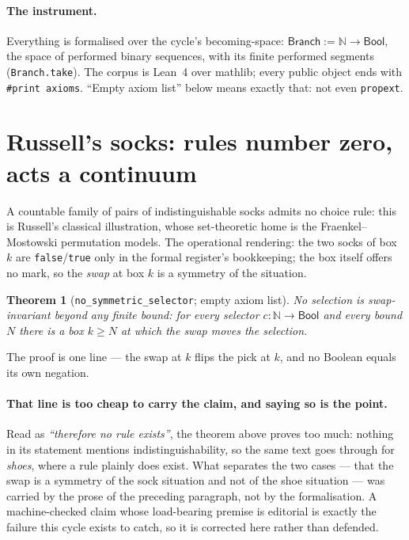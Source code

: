 \documentclass[11pt]{article}
\newtheorem{thm}{Theorem}[section]
\theoremstyle{remark}
\newcommand{\N}{\mathbb{N}}
\newcommand{\Branch}{\textsf{Branch}}
\begin{document}
\paragraph{The instrument.}  Everything is formalised over the cycle's
becoming-space: $\Branch := \N \to \mathsf{Bool}$, the space of
performed binary sequences, with its finite performed segments
(\texttt{Branch.take}).  The corpus is Lean~4 over mathlib; every public
object ends with \texttt{\#print axioms}.  ``Empty axiom list'' below
means exactly that: not even \texttt{propext}.

\section{Russell's socks: rules number zero, acts a continuum}
\label{sec:socks}

A countable family of pairs of indistinguishable socks admits no choice
rule: this is Russell's classical illustration, whose set-theoretic home
is the Fraenkel--Mostowski permutation models.  The operational
rendering: the two socks of box $k$ are \texttt{false}/\texttt{true} only
in the formal register's bookkeeping; the box itself offers no mark, so
the \emph{swap} at box $k$ is a symmetry of the situation.

\begin{thm}[\texttt{no\_symmetric\_selector}; empty axiom list]
No selection is swap-invariant beyond any finite bound: for every
selector $c : \N \to \mathsf{Bool}$ and every bound $N$ there is a box
$k \ge N$ at which the swap moves the selection.
\end{thm}

The proof is one line --- the swap at $k$ flips the pick at $k$, and no
Boolean equals its own negation.

\paragraph{That line is too cheap to carry the claim, and saying so is the
point.}  Read as \emph{``therefore no rule exists''}, the theorem above
proves too much: nothing in its statement mentions indistinguishability,
so the same text goes through for \emph{shoes}, where a rule plainly does
exist.  What separates the two cases --- that the swap is a symmetry of
the sock situation and not of the shoe situation --- was carried by the
prose of the preceding paragraph, not by the formalisation.  A
machine-checked claim whose load-bearing premise is editorial is exactly
the failure this cycle exists to catch, so it is corrected here rather
than defended.
\end{document}
